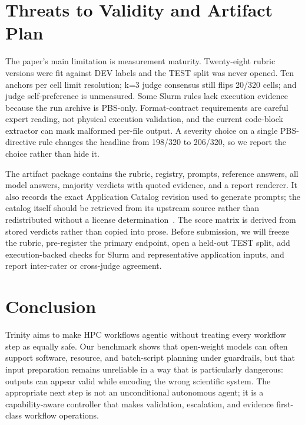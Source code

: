 \documentclass[conference]{IEEEtran}
\begin{document}
\section{Threats to Validity and Artifact Plan}
The paper's main limitation is measurement maturity. Twenty-eight rubric versions were fit against DEV labels and the TEST split was never opened. Ten anchors per cell limit resolution; k=3 judge consensus still flips 20/320 cells; and judge self-preference is unmeasured. Some Slurm rules lack execution evidence because the run archive is PBS-only. Format-contract requirements are careful expert reading, not physical execution validation, and the current code-block extractor can mask malformed per-file output. A severity choice on a single PBS-directive rule changes the headline from 198/320 to 206/320, so we report the choice rather than hide it.

The artifact package contains the rubric, registry, prompts, reference answers, all model answers, majority verdicts with quoted evidence, and a report renderer. It also records the exact Application Catalog revision used to generate prompts; the catalog itself should be retrieved from its upstream source rather than redistributed without a license determination~\cite{applicationcatalog}. The score matrix is derived from stored verdicts rather than copied into prose. Before submission, we will freeze the rubric, pre-register the primary endpoint, open a held-out TEST split, add execution-backed checks for Slurm and representative application inputs, and report inter-rater or cross-judge agreement.

\section{Conclusion}
Trinity aims to make HPC workflows agentic without treating every workflow step as equally safe. Our benchmark shows that open-weight models can often support software, resource, and batch-script planning under guardrails, but that input preparation remains unreliable in a way that is particularly dangerous: outputs can appear valid while encoding the wrong scientific system. The appropriate next step is not an unconditional autonomous agent; it is a capability-aware controller that makes validation, escalation, and evidence first-class workflow operations.



\end{document}
